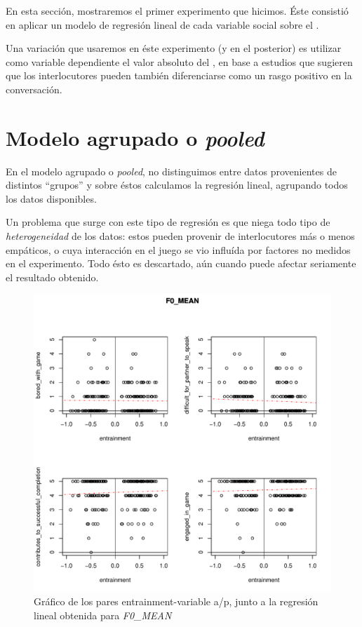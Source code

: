 En esta sección, mostraremos el primer experimento que hicimos. Éste consistió en aplicar un modelo de regresión lineal de cada variable social sobre el \entrainment.

Una variación que usaremos en éste experimento (y en el posterior) es utilizar como variable dependiente el valor absoluto del \entrainment, en base a estudios que sugieren que los interlocutores pueden también diferenciarse como un rasgo positivo en la conversación.

\section{Modelo agrupado o \emph{pooled}}

En el modelo agrupado o \emph{pooled}, no distinguimos entre datos provenientes de distintos ``grupos'' \cite{gujarati1999} y sobre éstos calculamos la regresión lineal, agrupando todos los datos disponibles.

Un problema que surge con este tipo de regresión es que niega todo tipo de \emph{heterogeneidad} de los datos: estos pueden provenir de interlocutores más o menos empáticos, o cuya interacción en el juego se vio influída por factores no medidos en el experimento. Todo ésto es descartado, aún cuando puede afectar seriamente  el resultado obtenido.


\begin{figure}[b!]
\includegraphics[width=15cm]{images/regression_F0_MEAN_1.pdf}
\caption{Gráfico de los pares entrainment-variable a/p, junto a la regresión lineal obtenida \label{regresion_clasica} para \emph{F0\_MEAN}}
\end{figure}

